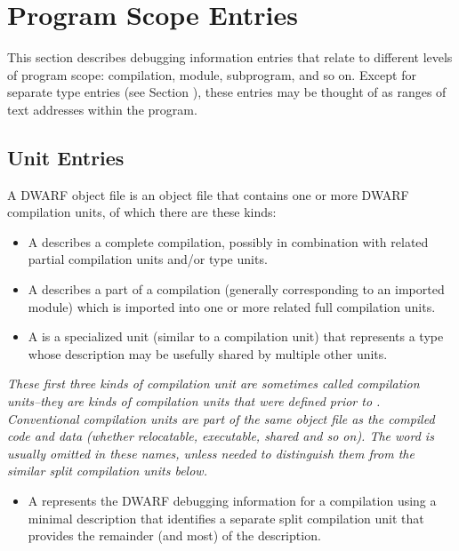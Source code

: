 \chapter{Program Scope Entries}
\label{chap:programscopeentries} 
This section describes debugging information entries that
relate to different levels of program scope: compilation,
module, subprogram, and so on. Except for separate type
entries (see Section ), 
these entries may be thought of as
ranges of text addresses within the program.

\section{Unit Entries}
\label{chap:unitentries}
A DWARF object file is an object file that contains one or more 
DWARF compilation units, of which there are these kinds:
\begin{itemize}
\item A  describes
a complete compilation, possibly in combination with
related partial compilation units and/or type units.

\item A  describes
a part of a compilation (generally corresponding to an
imported module) which is imported into one or more 
related full compilation units.

\item A  is a specialized unit
(similar to a compilation unit) that represents a type 
whose description may be usefully shared by multiple 
other units.
\end{itemize}


\textit{These first three kinds of compilation unit are
sometimes called  compilation
units--they are kinds of compilation units that were
defined prior to \DWARFVersionV. Conventional compilation units
are part of the same object file as the compiled code and
data (whether relocatable, executable, shared and so on).
The word  is usually
omitted in these names, unless needed to distinguish them
from the similar split compilation units below.}

\begin{itemize}
\item A  represents
the DWARF debugging information for a compilation using a
minimal description that identifies a separate split
compilation unit that provides the remainder (and most) 
of the description.
\end{itemize}


